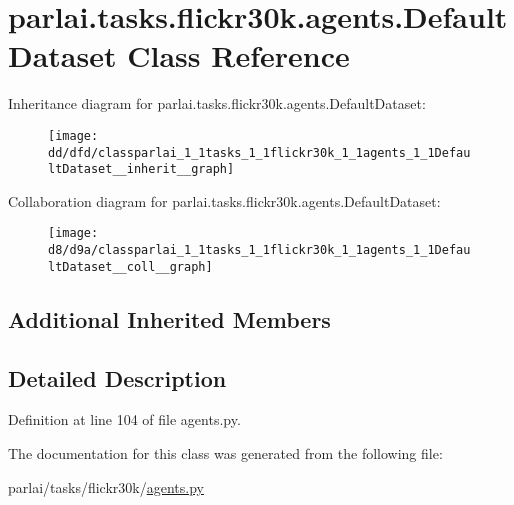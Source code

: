 \hypertarget{classparlai_1_1tasks_1_1flickr30k_1_1agents_1_1DefaultDataset}{}\section{parlai.\+tasks.\+flickr30k.\+agents.\+Default\+Dataset Class Reference}
\label{classparlai_1_1tasks_1_1flickr30k_1_1agents_1_1DefaultDataset}


Inheritance diagram for parlai.\+tasks.\+flickr30k.\+agents.\+Default\+Dataset\+:
\nopagebreak
\begin{figure}[H]
\begin{center}
\leavevmode
\texttt{[image: dd/dfd/classparlai\_1\_1tasks\_1\_1flickr30k\_1\_1agents\_1\_1DefaultDataset\_\_inherit\_\_graph]}
\end{center}
\end{figure}


Collaboration diagram for parlai.\+tasks.\+flickr30k.\+agents.\+Default\+Dataset\+:
\nopagebreak
\begin{figure}[H]
\begin{center}
\leavevmode
\texttt{[image: d8/d9a/classparlai\_1\_1tasks\_1\_1flickr30k\_1\_1agents\_1\_1DefaultDataset\_\_coll\_\_graph]}
\end{center}
\end{figure}
\subsection*{Additional Inherited Members}


\subsection{Detailed Description}


Definition at line 104 of file agents.\+py.



The documentation for this class was generated from the following file\+:\begin{DoxyCompactItemize}
\item 
parlai/tasks/flickr30k/\hyperlink{parlai_2tasks_2flickr30k_2agents_8py}{agents.\+py}\end{DoxyCompactItemize}
